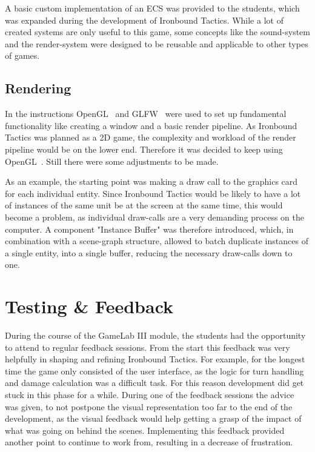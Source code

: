\documentclass[conference]{IEEEtran}
\begin{document}
A basic custom implementation of an ECS was provided to the students, which was expanded during the development
of Ironbound Tactics.
While a lot of created systems are only useful to this game, some concepts like the sound-system and the render-system
were designed to be reusable and applicable to other types of games.

\subsection{Rendering}
In the instructions OpenGL~\cite{b4} and GLFW~\cite{b5} were used to set up fundamental functionality like creating
a window and a basic render pipeline.
As Ironbound Tactics was planned as a 2D game, the complexity and workload of the render pipeline would
be on the lower end.
Therefore it was decided to keep using OpenGL~\cite{b4}.
Still there were some adjustments to be made.

As an example, the starting point was making a draw call to the graphics card for each individual entity.
Since Ironbound Tactics would be likely to have a lot of instances of the same unit be at the screen at the same time,
this would become a problem, as individual draw-calls are a very demanding process on the computer.
A component "Instance Buffer" was therefore introduced, which, in combination with a scene-graph structure, allowed to
batch duplicate instances of a single entity, into a single buffer, reducing the necessary draw-calls down to one.

\section{Testing \& Feedback}
During the course of the GameLab III module, the students had the opportunity to attend to regular feedback sessions.
From the start this feedback was very helpfully in shaping and refining Ironbound Tactics.
For example, for the longest time the game only consisted of the user interface, as the logic for turn handling and
damage calculation was a difficult task.
For this reason development did get stuck in this phase for a while.
During one of the feedback sessions the advice was given, to not postpone the visual representation too far to the end
of the development, as the visual feedback would help getting a grasp of the impact of what was going on behind the
scenes.
Implementing this feedback provided another point to continue to work from, resulting in a decrease of frustration.\newline
\end{document}
